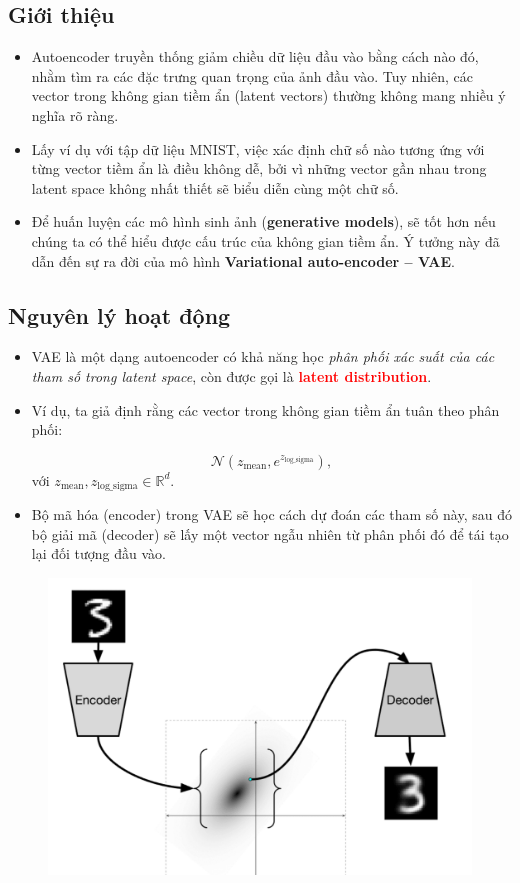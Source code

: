 \documentclass{book}
\begin{document}
\subsection{Giới thiệu}
\begin{itemize}
	\item Autoencoder truyền thống giảm chiều dữ liệu đầu vào bằng cách nào đó, nhằm tìm ra các đặc trưng quan trọng của ảnh đầu vào. Tuy nhiên, các vector trong không gian tiềm ẩn (latent vectors) thường không mang nhiều ý nghĩa rõ ràng.
	\item Lấy ví dụ với tập dữ liệu MNIST, việc xác định chữ số nào tương ứng với từng vector tiềm ẩn là điều không dễ, bởi vì những vector gần nhau trong latent space không nhất thiết sẽ biểu diễn cùng một chữ số.
	\item Để huấn luyện các mô hình sinh ảnh (\textbf{generative models}), sẽ tốt hơn nếu chúng ta có thể hiểu được cấu trúc của không gian tiềm ẩn. Ý tưởng này đã dẫn đến sự ra đời của mô hình \textbf{Variational auto-encoder – VAE}.
\end{itemize}

\subsection{Nguyên lý hoạt động}
\begin{itemize}
	\item VAE là một dạng autoencoder có khả năng học \textit{phân phối xác suất của các tham số trong latent space}, còn được gọi là \textbf{\textcolor{red}{latent distribution}}.
	
	\item Ví dụ, ta giả định rằng các vector trong không gian tiềm ẩn tuân theo phân phối:
	
	\[
	\mathcal{N}(z_{\text{mean}}, e^{z_{\text{log\_sigma}}}),
	\]
	với \( z_{\text{mean}}, z_{\text{log\_sigma}} \in \mathbb{R}^d \).
	
	\item Bộ mã hóa (encoder) trong VAE sẽ học cách dự đoán các tham số này, sau đó bộ giải mã (decoder) sẽ lấy một vector ngẫu nhiên từ phân phối đó để tái tạo lại đối tượng đầu vào.
\end{itemize}
\begin{figure}[H]
	\centering
	\includegraphics[width=0.75\linewidth]{images/au20.png}
\end{figure}
\end{document}
